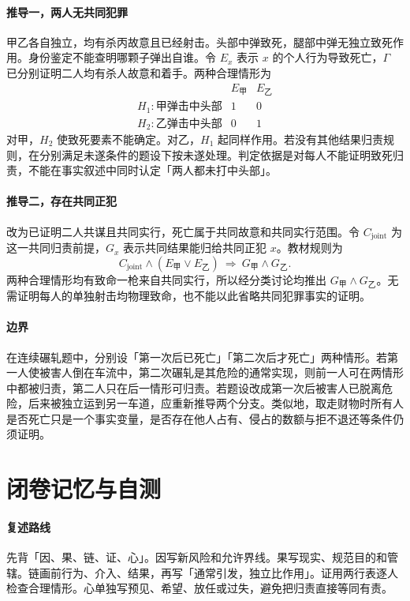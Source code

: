 \paragraph{推导一，两人无共同犯罪}
甲乙各自独立，均有杀丙故意且已经射击。头部中弹致死，腿部中弹无独立致死作用。身份鉴定不能查明哪颗子弹出自谁。令 $E_x$ 表示 $x$ 的个人行为导致死亡，$\Gamma$ 已分别证明二人均有杀人故意和着手。两种合理情形为
\[
\begin{array}{c|cc}
 & E_{\text{甲}} & E_{\text{乙}}\\ \hline
H_1\colon\text{甲弹击中头部} &1&0\\
H_2\colon\text{乙弹击中头部} &0&1
\end{array}
\]
对甲，$H_2$ 使致死要素不能确定。对乙，$H_1$ 起同样作用。若没有其他结果归责规则，在分别满足未遂条件的题设下按未遂处理。判定依据是对每人不能证明致死归责，不能在事实叙述中同时认定「两人都未打中头部」。

\paragraph{推导二，存在共同正犯}
改为已证明二人共谋且共同实行，死亡属于共同故意和共同实行范围。令 $C_{\mathrm{joint}}$ 为这一共同归责前提，$G_x$ 表示共同结果能归给共同正犯 $x$。教材规则为
\[
C_{\mathrm{joint}}\land(E_{\text{甲}}\lor E_{\text{乙}})
 \ \Longrightarrow\ G_{\text{甲}}\land G_{\text{乙}}.
\]
两种合理情形均有致命一枪来自共同实行，所以经分类讨论均推出 $G_{\text{甲}}\land G_{\text{乙}}$。无需证明每人的单独射击均物理致命，也不能以此省略共同犯罪事实的证明。

\paragraph{边界}
在连续碾轧题中，分别设「第一次后已死亡」「第二次后才死亡」两种情形。若第一人使被害人倒在车流中，第二次碾轧是其危险的通常实现，则前一人可在两情形中都被归责，第二人只在后一情形可归责。若题设改成第一次后被害人已脱离危险，后来被独立运到另一车道，应重新推导两个分支。类似地，取走财物时所有人是否死亡只是一个事实变量，是否存在他人占有、侵占的数额与拒不退还等条件仍须证明。

\section*{闭卷记忆与自测}

\paragraph{复述路线}
先背「因、果、链、证、心」。因写新风险和允许界线。果写现实、规范目的和管辖。链画前行为、介入、结果，再写「通常引发，独立比作用」。证用两行表逐人检查合理情形。心单独写预见、希望、放任或过失，避免把归责直接等同有责。

